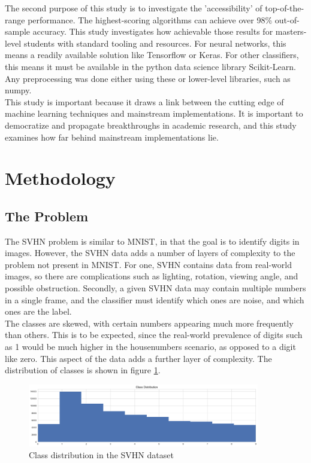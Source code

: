 \documentclass[12pt]{article}
\begin{document}
The second purpose of this study is to investigate the 'accessibility' of top-of-the-range performance. The highest-scoring algorithms can achieve over 98\% out-of-sample accuracy. This study investigates how achievable those results for masters-level students with standard tooling and resources. For neural networks, this means a readily available solution like Tensorflow or Keras. For other classifiers, this means it must be available in the python data science library Scikit-Learn. Any preprocessing was done either using these or lower-level libraries, such as numpy.\\

This study is important because it draws a link between the cutting edge of machine learning techniques and mainstream implementations. It is important to democratize and propagate breakthroughs in academic research, and this study examines how far behind mainstream implementations lie.\\

\newpage
\section{Methodology}

\subsection{The Problem}
The SVHN problem is similar to MNIST, in that the goal is to identify digits in images. However, the SVHN data adds a number of layers of complexity to the problem not present in MNIST. For one, SVHN contains data from real-world images, so there are complications such as lighting, rotation, viewing angle, and possible obstruction. Secondly, a given SVHN data may contain multiple numbers in a single frame, and the classifier must identify which ones are noise, and which ones are the label.\\

The classes are skewed, with certain numbers appearing much more frequently than others. This is to be expected, since the real-world prevalence of digits such as 1 would be much higher in the housenumbers scenario, as opposed to a digit like zero. This aspect of the data adds a further layer of complexity. The distribution of classes is shown in figure \ref{fig:classdist}.\\
\begin{figure}[h]
  \caption{Class distribution in the SVHN dataset}
  \label{fig:classdist}
\centering
\includegraphics[width=0.9\textwidth]{images/svhn_classes.png}
\end{figure}
\end{document}
